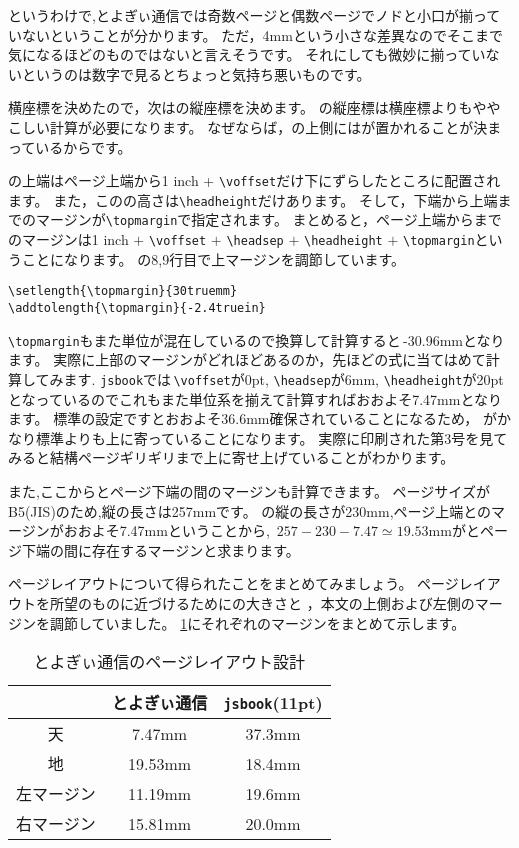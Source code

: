 というわけで,とよぎぃ通信では奇数ページと偶数ページでノドと小口が揃っていないということが分かります。
ただ，4mmという小さな差異なのでそこまで気になるほどのものではないと言えそうです。
それにしても微妙に揃っていないというのは数字で見るとちょっと気持ち悪いものです。

横座標を決めたので，次はの縦座標を決めます。
の縦座標は横座標よりもややこしい計算が必要になります。
なぜならば，の上側にはが置かれることが決まっているからです。

の上端はページ上端から1 inch + \verb|\voffset|だけ下にずらしたところに配置されます。
また，このの高さは\verb|\headheight|だけあります。
そして，下端から上端までのマージンが\verb|\topmargin|で指定されます。
まとめると，ページ上端からまでのマージンは1 inch $+$ \verb|\voffset| $+$ \verb|\headsep| $+$ \verb|\headheight| $+$ \verb|\topmargin|ということになります。
の8,9行目で上マージンを調節しています。
\begin{verbatim}
\setlength{\topmargin}{30truemm}
\addtolength{\topmargin}{-2.4truein}
\end{verbatim}
\verb|\topmargin|もまた単位が混在しているので換算して計算すると\,-30.96mmとなります。
実際に上部のマージンがどれほどあるのか，先ほどの式に当てはめて計算してみます. 
\verb|jsbook|では\,\verb|\voffset|が0pt, \verb|\headsep|が6mm, \verb|\headheight|が20pt
となっているのでこれもまた単位系を揃えて計算すればおおよそ7.47mmとなります。
標準の設定ですとおおよそ36.6mm確保されていることになるため，
がかなり標準よりも上に寄っていることになります。
実際に印刷された第3号を見てみると結構ページギリギリまで上に寄せ上げていることがわかります。

また,ここからとページ下端の間のマージンも計算できます。
ページサイズがB5(JIS)のため,縦の長さは257mmです。
の縦の長さが230mm,ページ上端とのマージンがおおよそ7.47mmということから,
\,$257 - 230 - 7.47 \simeq 19.53\mathrm{mm}$がとページ下端の間に存在するマージンと求まります。

ページレイアウトについて得られたことをまとめてみましょう。
ページレイアウトを所望のものに近づけるためにの大きさと
，本文の上側および左側のマージンを調節していました。
\tablename\ref{tbl:toyogylayout}にそれぞれのマージンをまとめて示します。

\begin{table}[!ht]
	\centering
	\caption{とよぎぃ通信のページレイアウト設計}
	\label{tbl:toyogylayout}
	\begin{tabular}{c|c|c} \hline \hline
		& とよぎぃ通信 & \verb|jsbook|(11pt) \\ \hline
		天 & 7.47mm & 37.3mm \\
		地 & 19.53mm & 18.4mm \\
		左マージン & 11.19mm & 19.6mm \\
		右マージン & 15.81mm & 20.0mm \\ \hline
	\end{tabular}
\end{table}

